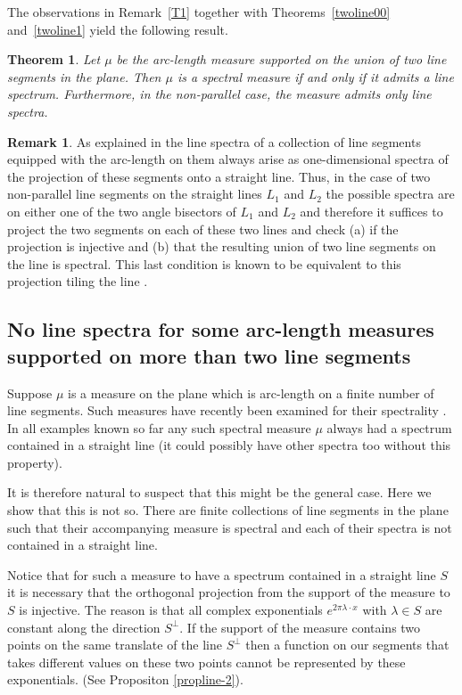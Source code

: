 \documentclass[12pt,a4paper,intlimits,sumlimits]{amsart}
\theoremstyle{plain}
\newtheorem{theorem}{Theorem}
\theoremstyle{definition}
\newtheorem{remark}{Remark}
\newcounter{rem}
\begin{document}
The observations in Remark~\ref{T1} together with Theorems~\ref{twoline00} and~\ref{twoline1} yield the following result.

\begin{theorem}\label{sum}
Let $\mu$ be the arc-length measure supported on the union of two line segments in the plane. Then $\mu$ is a spectral measure if and only if it admits a line spectrum. Furthermore, in the non-parallel case, the  measure admits only line spectra.
\end{theorem}
 
\begin{remark}\label{rem:projections}
As explained in \cite[\S 4]{kolountzakis2025spectrality} the line spectra of a collection of line segments equipped with the arc-length on them always arise as one-dimensional spectra of the projection of these segments onto a straight line. Thus, in the case of two non-parallel line segments on the straight lines $L_1$ and $L_2$ the possible spectra are on either one of the two angle bisectors of $L_1$ and $L_2$ and therefore it suffices to project the two segments on each of these two lines and check (a) if the projection is injective and (b) that the resulting union of two line segments on the line is spectral. This last condition is known to be equivalent to this projection tiling the line \cite{laba2001}.
\end{remark}
 

\subsection{No line spectra for some arc-length measures supported on more than two line segments}  
Suppose $\mu$ is a measure on the plane which is arc-length on a finite number of line segments. Such measures have recently been examined for their spectrality \cite{lai2021spectral,kolountzakis2025spectrality,kolountzakis2025non}. In all examples known so far any such spectral measure $\mu$ always had a spectrum contained in a straight line (it could possibly have other spectra too without this property).

It is therefore natural to suspect that this might be the general case. Here we show that this is not so. There are finite collections of line segments in the plane such that their accompanying measure is spectral and each of their spectra is not contained in a straight line.

Notice that for such a measure to have a spectrum contained in a straight line $S$ it is necessary that the orthogonal projection from the support of the measure to $S$ is injective. The reason is that all complex exponentials $e^{2\pi \lambda \cdot x}$ with $\lambda \in S$ are constant along the direction $S^\perp$. If the support of the measure contains two points on the same translate of the line $S^\perp$ then a function on our segments that takes different values on these two points cannot be represented by these exponentials. (See Propositon \ref{propline-2}).
\end{document}
